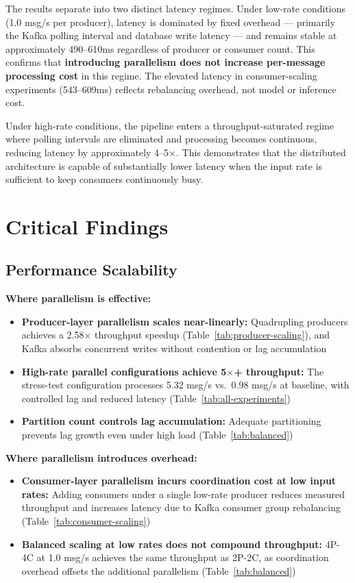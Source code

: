 \documentclass[12pt,a4paper]{report}
\begin{document}
The results separate into two distinct latency regimes. Under low-rate conditions
(1.0 msg/s per producer), latency is dominated by fixed overhead --- primarily the
Kafka polling interval and database write latency --- and remains stable at
approximately 490--610ms regardless of producer or consumer count. This confirms
that \textbf{introducing parallelism does not increase per-message processing cost}
in this regime. The elevated latency in consumer-scaling experiments (543--609ms)
reflects rebalancing overhead, not model or inference cost.

Under high-rate conditions, the pipeline enters a throughput-saturated regime where
polling intervals are eliminated and processing becomes continuous, reducing latency
by approximately 4--5$\times$. This demonstrates that the distributed architecture
is capable of substantially lower latency when the input rate is sufficient to keep
consumers continuously busy.

\section{Critical Findings}

\subsection{Performance Scalability}

\textbf{Where parallelism is effective:}
\begin{itemize}
    \item \textbf{Producer-layer parallelism scales near-linearly:} Quadrupling producers
    achieves a 2.58$\times$ throughput speedup (Table~\ref{tab:producer-scaling}), and
    Kafka absorbs concurrent writes without contention or lag accumulation
    \item \textbf{High-rate parallel configurations achieve 5$\times$+ throughput:}
    The stress-test configuration processes 5.32 msg/s vs.\ 0.98 msg/s at baseline,
    with controlled lag and reduced latency (Table~\ref{tab:all-experiments})
    \item \textbf{Partition count controls lag accumulation:} Adequate partitioning
    prevents lag growth even under high load (Table~\ref{tab:balanced})
\end{itemize}

\textbf{Where parallelism introduces overhead:}
\begin{itemize}
    \item \textbf{Consumer-layer parallelism incurs coordination cost at low input rates:}
    Adding consumers under a single low-rate producer reduces measured throughput and
    increases latency due to Kafka consumer group rebalancing
    (Table~\ref{tab:consumer-scaling})
    \item \textbf{Balanced scaling at low rates does not compound throughput:} 4P-4C at
    1.0 msg/s achieves the same throughput as 2P-2C, as coordination overhead offsets
    the additional parallelism (Table~\ref{tab:balanced})
\end{itemize}
\end{document}
